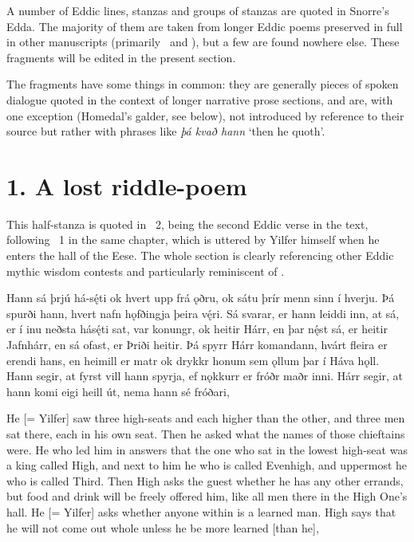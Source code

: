 
A number of Eddic lines, stanzas and groups of stanzas are quoted in Snorre’s Edda.  The majority of them are taken from longer Eddic poems preserved in full in other manuscripts (primarily \Regius\ and \AM), but a few are found nowhere else.  These fragments will be edited in the present section.

The fragments have some things in common: they are generally pieces of spoken dialogue quoted in the context of longer narrative prose sections, and are, with one exception (Homedal’s galder, see below), not introduced by reference to their source but rather with phrases like \emph{þá kvað hann} ‘then he quoth’.

\sectionline

\section{1. A lost riddle-poem}

This half-stanza is quoted in \Gylfaginning\ 2, being the second Eddic verse in the text, following \Havamal\ 1 in the same chapter, which is uttered by Yilfer himself when he enters the hall of the Eese. The whole section is clearly referencing other Eddic mythic wisdom contests and particularly reminiscent of \Vafthrudnismal.

\bpg\bpa[0]Hann sá þrjú há-sę́ti ok hvert upp frá ǫðru, ok sátu þrír menn sinn í hverju. Þá spurði hann, hvert nafn hǫfðingja þeira vę́ri. Sá svarar, er hann leiddi inn, at sá, er í inu neðsta hásę́ti sat, var konungr, ok heitir Hárr, en þar nę́st sá, er heitir Jafnhárr, en sá ofast, er Þriði heitir. Þá spyrr Hárr komandann, hvárt fleira er erendi hans, en heimill er matr ok drykkr honum sem ǫllum þar í Háva hǫll. Hann segir, at fyrst vill hann spyrja, ef nǫkkurr er fróðr maðr inni. Hárr segir, at hann komi eigi heill út, nema hann sé fróðari,\epa

\bpb He [= Yilfer] saw three high-seats and each higher than the other, and three men sat there, each in his own seat. Then he asked what the names of those chieftains were. He who led him in answers that the one who sat in the lowest high-seat was a king called High, and next to him he who is called Evenhigh, and uppermost he who is called Third. Then High asks the guest whether he has any other errands, but food and drink will be freely offered him, like all men there in the High One’s hall. He [= Yilfer] asks whether anyone within is a learned man.  High says that he will not come out whole unless he be more learned [than he],\epb\epg

